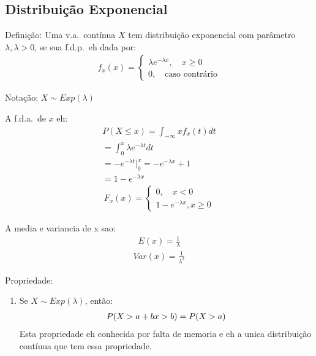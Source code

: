 \documentclass[11pt,a4paper]{book}
\begin{document}
\subsection{Distribuição Exponencial}
\begin{description}
  \item {Definição}: Uma v.a.\ contínua $X$ tem distribuição exponencial com parâmetro $\lambda, \lambda>0$, se sua
    f.d.p.\ eh dada por:
    \begin{align*}
      f_{x} (x)= \begin{cases}
        \lambda e^{- \lambda x} , \quad x \ge 0 \\
        0, \quad \text{caso contrário}
      \end{cases}
    \end{align*}
  \item{Notação}: $X \mathtt{\sim} Exp(\lambda)$
    \item A f.d.a.\ de $x$ eh:
      \begin{align*}
        P(X \le x)  = \int_{ -\infty }{x} f_{x}(t)dt \\
        = \int_{0}^{x} \lambda e^{-\lambda t } dt \\
        = -e^{-\lambda t} |_{0}^{x} = -e^{-\lambda x} +1\\
        = 1- e^{-\lambda x}
      \end{align*}
      \begin{align*}
        F_{x} (x) = \begin{cases}
         0, \quad x<0\\
         1-e^{-\lambda x} , x\ge 0
        \end{cases}
      \end{align*}
    \item A media e variancia de x sao:
      \begin{align*}
        E(x) = \frac{1}{\lambda}
      \end{align*}
      \begin{align*}
        Var(x) = \frac{1}{\lambda^2}
      \end{align*}
    \item{Propriedade}:
      \begin{enumerate}
        \item Se $X \mathtt{\sim}  Exp(\lambda)$, então:
        \begin{align*}
          P(X> a+b  \/ x>b) = P(X > a)
        \end{align*}
        Esta propriedade eh conhecida por falta de memoria e eh a unica distribuição 
        contínua que tem essa propriedade.


\end{enumerate}
\end{description}
\end{document}
